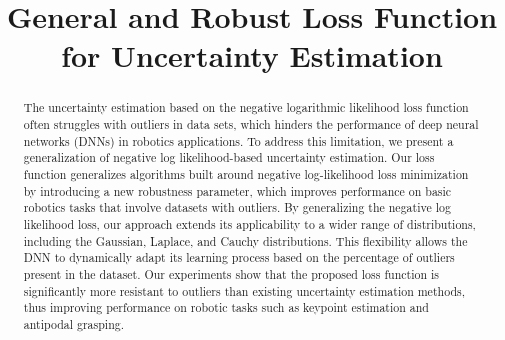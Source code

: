 \documentclass[letterpaper, 10 pt, conference]{ieeeconf}  %
\title{\LARGE \bf
General and Robust Loss Function for Uncertainty Estimation}
\begin{document}
\maketitle
\thispagestyle{empty}
\pagestyle{empty}


\begin{abstract}


The uncertainty estimation based on the negative logarithmic likelihood loss function often struggles with outliers in data sets, which hinders the performance of deep neural networks (DNNs) in robotics applications. 
To address this limitation, we present a generalization of negative log likelihood-based uncertainty estimation.
Our loss function generalizes algorithms built around negative log-likelihood loss minimization by introducing a new robustness parameter, which improves performance on basic robotics tasks that involve datasets with outliers.
By generalizing the negative log likelihood loss, our approach extends its applicability to a wider range of distributions, including the Gaussian, Laplace, and Cauchy distributions. This flexibility allows the DNN to dynamically adapt its learning process based on the percentage of outliers present in the dataset.
Our experiments show that the proposed loss function is significantly more resistant to outliers than existing uncertainty estimation methods, thus improving performance on robotic tasks such as keypoint estimation and antipodal grasping.
\end{abstract}


\end{document}
